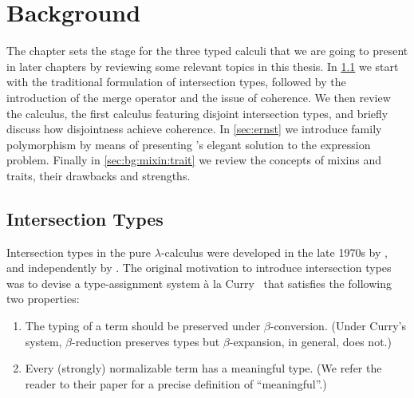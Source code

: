 
\chapter{Background}
\label{chap:background}

The chapter sets the stage for the three typed calculi that we are going to
present in later chapters by reviewing some relevant topics in this thesis. In
\cref{bg:sec:intersection} we start with the traditional formulation of
intersection types, followed by the introduction of the merge operator and the
issue of coherence. We then review the \oname calculus, the first calculus
featuring disjoint intersection types, and briefly discuss how disjointness
achieve coherence. In \cref{sec:ernst} we introduce family polymorphism by
means of presenting \citeauthor{Ernst_2001}'s elegant solution to the expression problem.
Finally in \cref{sec:bg:mixin:trait} we review the concepts of mixins and
traits, their drawbacks and strengths.




\section{Intersection Types}
\label{bg:sec:intersection}


Intersection types in the pure $\lambda$-calculus were developed in the late
1970s by \citet{coppoInter}, and independently by \citet{pottinger1980type}. The
original motivation to introduce intersection types was to devise a
type-assignment system \`a la Curry~\citep{CurryFeys} that satisfies the
following two properties:
\begin{enumerate}
\item The typing of a term should be preserved under $\beta$-conversion. (Under
  Curry's system, $\beta$-reduction preserves types but $\beta$-expansion, in
  general, does not.)
\item Every (strongly) normalizable term has a meaningful type. (We refer the
  reader to their paper for a precise definition of ``meaningful''.)
\end{enumerate}

